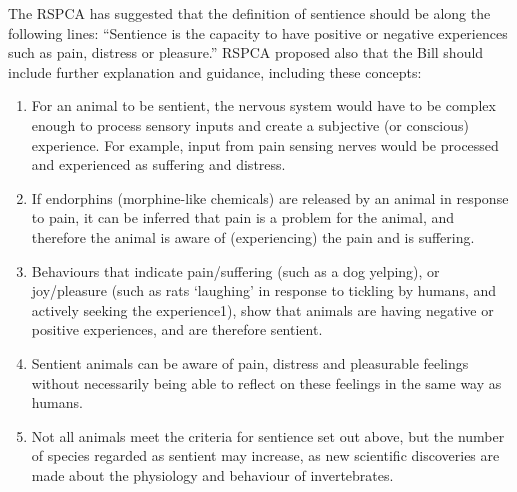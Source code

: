 \documentclass[10pt,a4paper]{article}
\begin{document}
	The RSPCA has suggested that the definition of sentience should be along the following lines: “Sentience is the capacity to have positive or negative experiences such as pain, distress or pleasure.” 
	RSPCA proposed also that the Bill should include further explanation and guidance, including these concepts:
	\begin{enumerate}
	\item For an animal to be sentient, the nervous system would have to be complex enough to process sensory inputs and create a subjective (or conscious) experience. For example, input from pain sensing nerves would be processed and experienced as suffering and distress.
	\item If endorphins (morphine-like chemicals) are released by an animal in response to pain, it can be inferred that pain is a problem for the animal, and therefore the animal is aware of (experiencing) the pain and is suffering.
	\item Behaviours that indicate pain/suffering (such as a dog yelping), or joy/pleasure (such as rats ‘laughing’ in response to tickling by humans, and actively seeking the experience1), show that animals are having negative or positive experiences, and are therefore sentient.
	\item Sentient animals can be aware of pain, distress and pleasurable feelings without necessarily being able to reflect on these feelings in the same way as humans.
	\item Not all animals meet the criteria for sentience set out above, but the number of species
	regarded as sentient may increase, as new scientific discoveries are made about the physiology and behaviour of invertebrates. 
    \end{enumerate}



\end{document}
